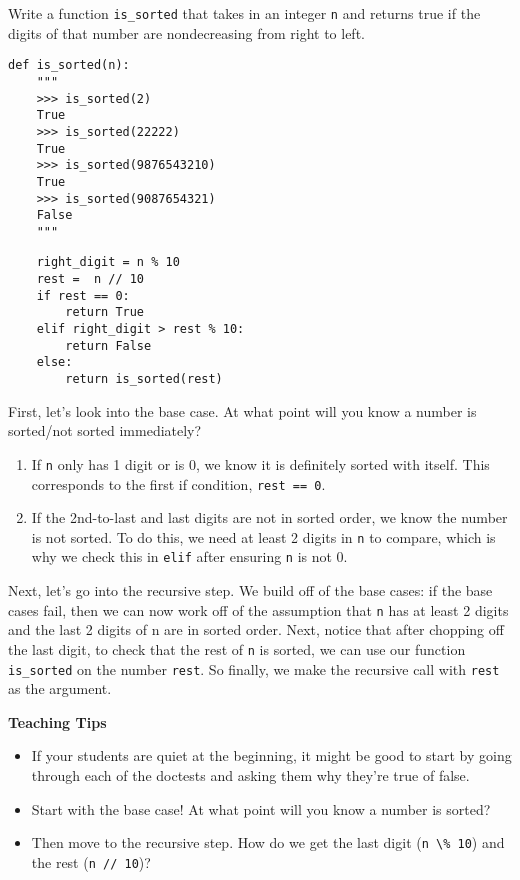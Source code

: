 \begin{blocksection}

\question Write a function \lstinline{is_sorted} that takes in an integer
\lstinline{n} and returns true if the digits of that number are nondecreasing from
right to left.

\begin{lstlisting}
def is_sorted(n):
    """
    >>> is_sorted(2)
    True
    >>> is_sorted(22222)
    True
    >>> is_sorted(9876543210)
    True
    >>> is_sorted(9087654321)
    False
    """
\end{lstlisting}

\begin{solution}[1in]
\begin{lstlisting}
    right_digit = n % 10
    rest =  n // 10
    if rest == 0:
        return True
    elif right_digit > rest % 10:
        return False
    else:
        return is_sorted(rest)
\end{lstlisting}

First, let's look into the base case. At what point will you know a number is sorted/not sorted immediately?
\begin{enumerate}
\item If \lstinline{n} only has 1 digit or is 0, we know it is definitely sorted with itself. This corresponds to the first if condition, \lstinline{rest == 0}.
\item If the 2nd-to-last and last digits are not in sorted order, we know the number is not sorted. To do this, we need at least 2 digits in \lstinline{n} to compare, which is why we check this in \lstinline{elif} after ensuring \lstinline{n} is not 0.
\end{enumerate}

Next, let's go into the recursive step. We build off of the base cases: if the base cases fail, then we can now work off of the assumption that \lstinline{n} has at least 2 digits and the last 2 digits of n are in sorted order. Next, notice that after chopping off the last digit, to check that the rest of \lstinline{n} is sorted, we can use our function \lstinline{is_sorted} on the number \lstinline{rest}. So finally, we make the recursive call with \lstinline{rest} as the argument.
\end{solution}
\end{blocksection}


\begin{questionmeta}
  \textbf{Teaching Tips}
  \begin{itemize}
      \item If your students are quiet at the beginning, it might be good to start by going through each of the doctests and asking them why they're true of false.
      \item Start with the base case! At what point will you know a number is sorted?
      \item Then move to the recursive step. How do we get the last digit (\lstinline{n \% 10}) and the rest (\lstinline{n // 10})?
  \end{itemize}
\end{questionmeta}

